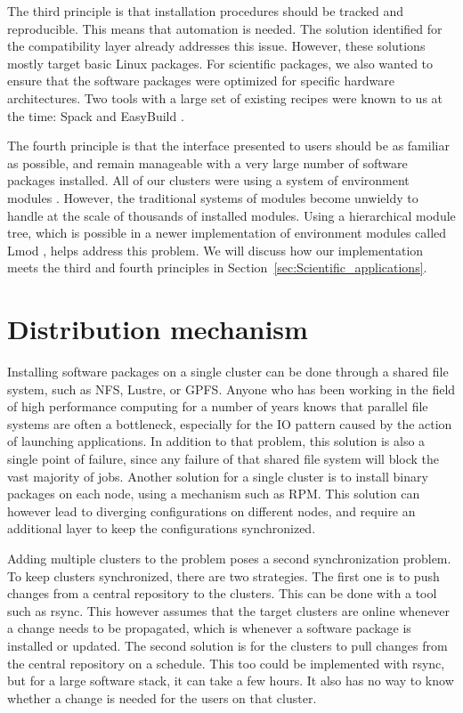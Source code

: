 \documentclass[sigconf]{acmart}
\begin{document}
The third principle is that installation procedures should be tracked and reproducible. This means that automation is
needed. The solution identified for the compatibility layer already addresses this issue. However, these solutions
mostly target basic Linux packages. For scientific packages, we also wanted to ensure that the software packages were
optimized for specific hardware architectures. Two tools with a large set of existing recipes were known to us at the
time: Spack\cite{Spack} and EasyBuild \cite{EasyBuild2012,EasyBuild2014,EasyBuild2016}.

The fourth principle is that the interface presented to users should be as familiar as possible, and remain manageable
with a very large number of software packages installed. All of our clusters were using a system of environment modules
\cite{Modules1991,Modules1996}. However, the traditional systems of modules become unwieldy to handle at the scale of
thousands of installed modules. Using a hierarchical module tree, which is possible in a newer implementation of
environment modules called Lmod \cite{Lmod}, helps address this problem. We will discuss how our implementation meets
the third and fourth principles in Section~\ref{sec:Scientific_applications}.


\section{Distribution mechanism}
\label{sec:Distribution_mechanism}
Installing software packages on a single cluster can be done through a shared file system, such as NFS, Lustre, or
GPFS. Anyone who has been working in the field of high performance computing for a number of years knows that parallel
file systems are often a bottleneck, especially for the IO pattern caused by the action of launching applications. In
addition to that problem, this solution is also a single point of failure, since any failure of that shared file system
will block the vast majority of jobs. Another solution for a single cluster is to install binary packages on each node,
using a mechanism such as RPM. This solution can however lead to diverging configurations on different nodes, and
require an additional layer to keep the configurations synchronized. 

Adding multiple clusters to the problem poses a second synchronization problem. To keep clusters synchronized, there
are two strategies. The first one is to push changes from a central repository to the clusters. This can be done with a
tool such as rsync. This however assumes that the target clusters are online whenever a change needs to be propagated,
which is whenever a software package is installed or updated. The second solution is for the clusters to pull changes
from the central repository on a schedule. This too could be implemented with rsync, but for a large software stack, it
can take a few hours. It also has no way to know whether a change is needed for the users on that cluster.
\end{document}
